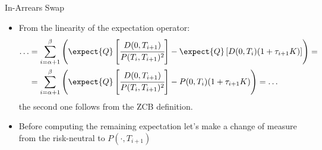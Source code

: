 \documentclass{beamer}
\begin{document}
\begin{frame}{In-Arrears Swap}
\begin{itemize}
\item<1-> From the linearity of the expectation operator:
\begin{equation*}
\begin{aligned}
\ldots &=\sum_{i=\alpha+1}^{\beta}\left(\expect{Q}\left[\cfrac{D(0,T_{i+1})}{P(T_i,T_{i+1})^2}\right]-\expect{Q}\left[D(0,T_i)(1+\tau_{i+1}K)\right]\right) = \\
&=\sum_{i=\alpha+1}^{\beta}\left(\expect{Q}\left[\cfrac{D(0,T_{i+1})}{P(T_i,T_{i+1})^2}\right]-P(0,T_i)(1+\tau_{i+1}K)\right) = \ldots\\
\end{aligned}
\end{equation*}
the second one follows from the ZCB definition.
\item<2-> Before computing the remaining expectation let's make a change of measure from the risk-neutral to $P(\cdot, T_{i+1})$
\end{itemize}
\end{frame}
\end{document}
